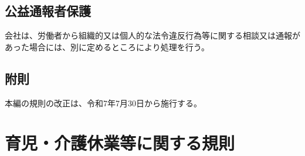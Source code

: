 \documentclass[10pt,a4paper,uplatex]{jsarticle}
\begin{document}
\subsection{公益通報者保護}

会社は、労働者から組織的又は個人的な法令違反行為等に関する相談又は通報があった場合には、別に定めるところにより処理を行う。

\subsection*{附則}
本編の規則の改正は、令和7年7月30日から施行する。



\clearpage
\section{育児・介護休業等に関する規則}
\end{document}

